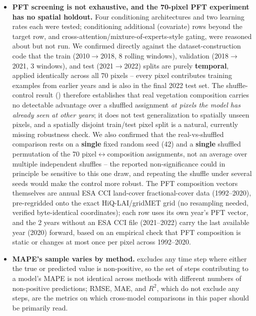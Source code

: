 \documentclass[11pt]{article}
\begin{document}
\begin{itemize}
    of the leakage diagnostic's $\sim$0.6 $\Delta R^2$ reproduction gap between two nominally
    identical fine-tuning conditions.
  \item \textbf{PFT screening is not exhaustive, and the 70-pixel PFT experiment has no spatial
    holdout.} Four conditioning architectures and two learning rates each were tested;
    conditioning additional (covariate) rows beyond the target row, and
    cross-attention/mixture-of-experts-style gating, were reasoned about but not run. We confirmed
    directly against the dataset-construction code that the train (2010$\rightarrow$2018, 8
    rolling windows), validation (2018$\rightarrow$2021, 3 windows), and test
    (2021$\rightarrow$2022) splits are purely \textbf{temporal}, applied identically across all 70
    pixels -- every pixel contributes training examples from earlier years and is also in the
    final 2022 test set. The shuffle-control result () therefore
    establishes that real vegetation composition carries no detectable advantage over a shuffled
    assignment \emph{at pixels the model has already seen at other years}; it does not test
    generalization to spatially unseen pixels, and a spatially disjoint train/test pixel split is
    a natural, currently missing robustness check. We also confirmed that the real-vs-shuffled
    comparison rests on a \textbf{single} fixed random seed (42) and a \textbf{single} shuffled
    permutation of the 70 pixel$\leftrightarrow$composition assignments, not an average over
    multiple independent shuffles -- the reported non-significance could in principle be sensitive
    to this one draw, and repeating the shuffle under several seeds would make the control more
    robust. The PFT composition vectors themselves are annual ESA CCI land-cover fractional-cover
    data (1992--2020), pre-regridded onto the exact HiQ-LAI/gridMET grid (no resampling needed,
    verified byte-identical coordinates); each row uses its own year's PFT vector, and the 2
    years without an ESA CCI file (2021--2022) carry the last available year (2020) forward, based
    on an empirical check that PFT composition is static or changes at most once per pixel across
    1992--2020.
  \item \textbf{MAPE's sample varies by method.}  excludes any time step where either
    the true or predicted value is non-positive, so the set of steps contributing to a model's MAPE
    is not identical across methods with different numbers of non-positive predictions; RMSE, MAE,
    and $R^2$, which do not exclude any steps, are the metrics on which cross-model comparisons in
    this paper should be primarily read.
\end{itemize}
\end{document}
